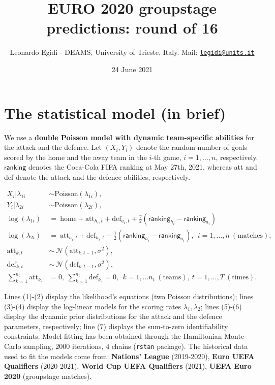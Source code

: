 \documentclass[
  10pt,
]{article}
\title{EURO 2020 groupstage predictions: round of 16}
\author{Leonardo Egidi - DEAMS, University of Trieste, Italy. Mail:
\href{mailto:legidi@units.it}{\nolinkurl{legidi@units.it}}}
\date{24 June 2021}
\begin{document}
\maketitle

{
\setcounter{tocdepth}{2}
\tableofcontents
}
\hypertarget{the-statistical-model-in-brief}{%
\section{The statistical model (in
brief)}\label{the-statistical-model-in-brief}}

We use a \textbf{double Poisson model with dynamic team-specific
abilities} for the attack and the defence. Let \((X_{i}, Y_{i})\) denote
the random number of goals scored by the home and the away team in the
\(i\)-th game, \(i=1,\ldots,n\), respectively. \(\mathsf{ranking}\)
denotes the Coca-Cola FIFA ranking at May 27th, 2021, whereas att and
def denote the attack and the defence abilities, respectively.

\begin{align}
X_i| \lambda_{1i} &\sim \text{Poisson}(\lambda_{1i}),\\
Y_i|\lambda_{2i} &\sim \text{Poisson}(\lambda_{2i}),  \\
\log(\lambda_{1i}) &=\  \text{home} + \text{att}_{h_i, t}+ \text{def}_{a_i,t} + \frac{\gamma}{2}(\mathsf{ranking}_{h_i}-\mathsf{ranking}_{a_i}) \\
\log(\lambda_{2i}) & =\    \text{att}_{a_i,t} + \text{def}_{h_i,t} - \frac{\gamma}{2}(\mathsf{ranking}_{h_i}-\mathsf{ranking}_{a_i}), \ \ i=1,\ldots,n\ (\text{matches}), \\
\text{att}_{k, t} &\sim \ \mathcal{N}(\text{att}_{k, t-1}, \sigma^2), \\
\text{def}_{k, t} &\sim \  \mathcal{N}(\text{def}_{k, t-1}, \sigma^2),\\
\sum_{k=1}^{n_t} \text{att}_{k, }&=0, \  \sum_{k=1}^{n_t}\text{def}_{k, }=0, \ \ k=1,\ldots n_t \ (\text{teams}), \  t=1,\ldots, T \ (\text{times}).
\label{eq:scoring_rue}
\end{align}

Lines (1)-(2) display the likelihood's equations (two Poisson
distributions); lines (3)-(4) display the log-linear models for the
scoring rates \(\lambda_{1}, \lambda_{2}\); lines (5)-(6) display the
dynamic prior distributions for the attack and the defence parameters,
respectively; line (7) displays the sum-to-zero identifiability
constraints. Model fitting has been obtained through the Hamiltonian
Monte Carlo sampling, 2000 iterations, 4 chains (\texttt{rstan}
package). The historical data used to fit the models come from:
\textbf{Nations' League} (2019-2020), \textbf{Euro UEFA Qualifiers}
(2020-2021), \textbf{World Cup UEFA Qualifiers} (2021), \textbf{UEFA
Euro 2020} (groupstage matches).
\end{document}
